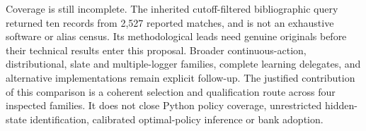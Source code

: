 Coverage is still incomplete. The inherited cutoff-filtered bibliographic query
returned ten records from 2,527 reported matches, and is not an exhaustive software
or alias census. Its methodological leads need genuine originals before their
technical results enter this proposal. Broader continuous-action, distributional,
slate and multiple-logger families, complete learning delegates, and alternative
implementations remain explicit follow-up. The justified contribution of this
comparison is a coherent selection and qualification route across four inspected
families. It does not close Python policy coverage, unrestricted hidden-state
identification, calibrated optimal-policy inference or bank adoption.
\citep{exec24_policiespython_comparison}
